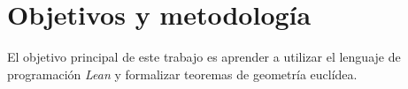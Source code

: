 \section{Objetivos y metodología}

El objetivo principal de este trabajo es aprender a utilizar el lenguaje de
programación \textit{Lean} y formalizar teoremas de geometría euclídea.



\newpage



